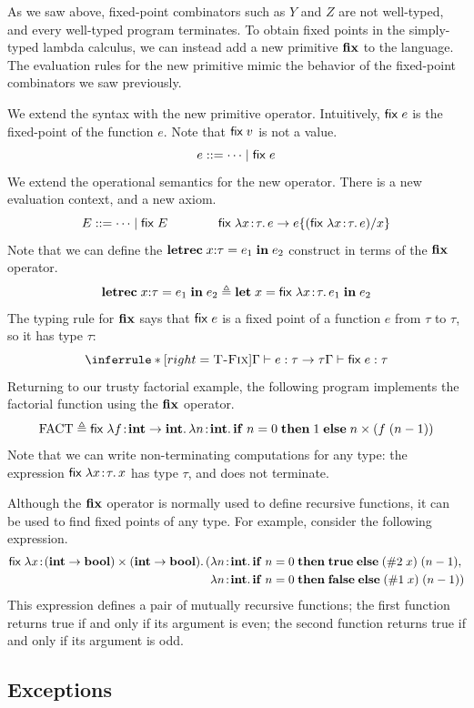 As we saw above, fixed-point combinators such as $Y$ and $Z$ are not well-typed, and every well-typed program terminates. To obtain fixed points in the simply-typed lambda calculus, we can instead add a new primitive $\mathbf{fix}$ to the language. The evaluation rules for the new primitive mimic the behavior of the fixed-point combinators we saw previously.

We extend the syntax with the new primitive operator. Intuitively, $\mathsf{fix}\; e$ is the fixed-point of the function $e$. Note that $\mathsf{fix}\; v$ is not a value.
\[
e ::= \cdots \mid \mathsf{fix}\; e
\]
We extend the operational semantics for the new operator. There is a new evaluation context, and a new axiom.
\[
E ::= \cdots \mid \mathsf{fix}\; E
\qquad\qquad
\mathsf{fix}\; \lambda x\!:\!\tau.\, e \to e\{(\mathsf{fix}\; \lambda x\!:\!\tau.\, e)/x\}
\]
Note that we can define the $\mathbf{letrec}\; x{:}\tau = e_1\; \mathbf{in}\; e_2$ construct in terms of the $\mathbf{fix}$ operator.
\[
\mathbf{letrec}\; x{:}\tau = e_1\; \mathbf{in}\; e_2 \triangleq \mathbf{let}\; x = \mathsf{fix}\; \lambda x\!:\!\tau.\, e_1\; \mathbf{in}\; e_2
\]
The typing rule for $\mathbf{fix}$ says that $\mathsf{fix}\; e$ is a fixed point of a function $e$ from $\tau$ to $\tau$, so it has type $\tau$:
\[
\inferrule*[right=\rn{T-Fix}]{\Gamma \vdash e : \tau \to \tau}{\Gamma \vdash \fix e : \tau}
\]
Returning to our trusty factorial example, the following program implements the factorial function using the $\mathbf{fix}$ operator.
\[
\mathrm{FACT} \triangleq \mathsf{fix}\; \lambda f\!:\!\mathbf{int} \to \mathbf{int}.\, \lambda n\!:\!\mathbf{int}.\, \mathbf{if}\; n = 0\; \mathbf{then}\; 1\; \mathbf{else}\; n \times (f\; (n - 1))
\]
Note that we can write non-terminating computations for any type: the expression $\mathsf{fix}\; \lambda x\!:\!\tau.\, x$ has type $\tau$, and does not terminate.

Although the $\mathbf{fix}$ operator is normally used to define recursive functions, it can be used to find fixed points of any type. For example, consider the following expression.
\begin{align*}
\mathsf{fix}\; \lambda x\!:\!(\mathbf{int} \to \mathbf{bool}) \times (\mathbf{int} \to \mathbf{bool}).\,
 ( &\lambda n\!:\!\mathbf{int}.\, \mathbf{if}\; n = 0\; \mathbf{then}\; \mathbf{true}\; \mathbf{else}\; (\#2\; x)\; (n - 1), \\
   &\lambda n\!:\!\mathbf{int}.\, \mathbf{if}\; n = 0\; \mathbf{then}\; \mathbf{false}\; \mathbf{else}\; (\#1\; x)\; (n - 1))
\end{align*}
This expression defines a pair of mutually recursive functions; the first function returns true if and only if its argument is even; the second function returns true if and only if its argument is odd.

\subsection{Exceptions}


